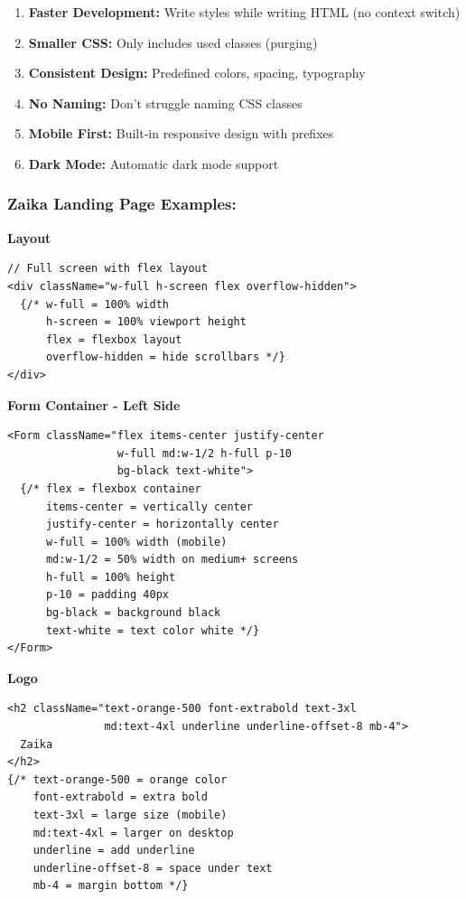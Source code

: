 \documentclass[12pt]{article}
\begin{document}
\begin{enumerate}
    \item \textbf{Faster Development:} Write styles while writing HTML (no context switch)
    \item \textbf{Smaller CSS:} Only includes used classes (purging)
    \item \textbf{Consistent Design:} Predefined colors, spacing, typography
    \item \textbf{No Naming:} Don't struggle naming CSS classes
    \item \textbf{Mobile First:} Built-in responsive design with prefixes
    \item \textbf{Dark Mode:} Automatic dark mode support
\end{enumerate}

\subsubsection*{Zaika Landing Page Examples:}

\textbf{Layout}

\begin{lstlisting}
// Full screen with flex layout
<div className="w-full h-screen flex overflow-hidden">
  {/* w-full = 100% width
      h-screen = 100% viewport height
      flex = flexbox layout
      overflow-hidden = hide scrollbars */}
</div>
\end{lstlisting}

\textbf{Form Container - Left Side}

\begin{lstlisting}
<Form className="flex items-center justify-center 
                 w-full md:w-1/2 h-full p-10 
                 bg-black text-white">
  {/* flex = flexbox container
      items-center = vertically center
      justify-center = horizontally center
      w-full = 100% width (mobile)
      md:w-1/2 = 50% width on medium+ screens
      h-full = 100% height
      p-10 = padding 40px
      bg-black = background black
      text-white = text color white */}
</Form>
\end{lstlisting}

\textbf{Logo}

\begin{lstlisting}
<h2 className="text-orange-500 font-extrabold text-3xl 
               md:text-4xl underline underline-offset-8 mb-4">
  Zaika
</h2>
{/* text-orange-500 = orange color
    font-extrabold = extra bold
    text-3xl = large size (mobile)
    md:text-4xl = larger on desktop
    underline = add underline
    underline-offset-8 = space under text
    mb-4 = margin bottom */}
\end{lstlisting}
\end{document}
